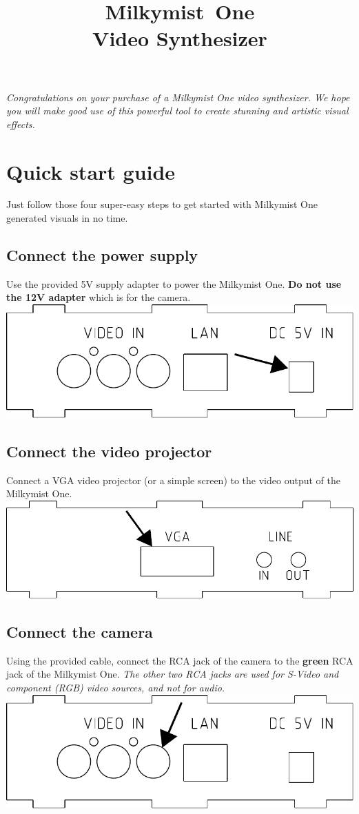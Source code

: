 \documentclass{leaflet}
\title{Milkymist\texttrademark~One\\Video Synthesizer}
\date{}
\begin{document}
\maketitle
\thispagestyle{empty}
\pagestyle{empty} 
\textit{Congratulations on your purchase of a Milkymist One video synthesizer. We hope you will make good use of this powerful tool to create stunning and artistic visual effects.}

\section{Quick start guide}
Just follow those four super-easy steps to get started with Milkymist One generated visuals in no time.

\subsection{Connect the power supply}
Use the provided 5V supply adapter to power the Milkymist One. \textbf{Do not use the 12V adapter} which is for the camera.
\includegraphics[width=\textwidth]{power.pdf}

\subsection{Connect the video projector}
Connect a VGA video projector (or a simple screen) to the video output of the Milkymist One.
\includegraphics[width=\textwidth]{vga.pdf}

\subsection{Connect the camera}
Using the provided cable, connect the RCA jack of the camera to the \textbf{green} RCA jack of the Milkymist One. \textit{The other two RCA jacks are used for S-Video and component (RGB) video sources, and not for audio.}
\includegraphics[width=\textwidth]{videoin.pdf}
\end{document}
